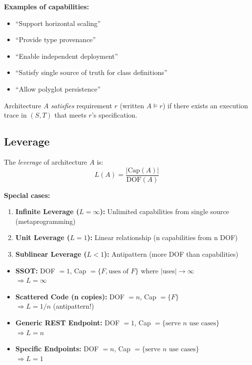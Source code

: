 \textbf{Examples of capabilities:}
\begin{itemize}
\item ``Support horizontal scaling''
\item ``Provide type provenance''
\item ``Enable independent deployment''
\item ``Satisfy single source of truth for class definitions''
\item ``Allow polyglot persistence''
\end{itemize}

\begin{definition}\label{def:satisfies}
Architecture $A$ \emph{satisfies} requirement $r$ (written $A \vDash r$) if there exists an execution trace in $(S, T)$ that meets $r$'s specification.
\end{definition}

\subsection{Leverage}

\begin{definition}[Leverage]\label{def:leverage}
The \emph{leverage} of architecture $A$ is:
\[
L(A) = \frac{|\text{Cap}(A)|}{\text{DOF}(A)}
\]
\end{definition}

\textbf{Special cases:}
\begin{enumerate}
\item \textbf{Infinite Leverage ($L = \infty$):} Unlimited capabilities from single source (metaprogramming)
\item \textbf{Unit Leverage ($L = 1$):} Linear relationship (n capabilities from n DOF)
\item \textbf{Sublinear Leverage ($L < 1$):} Antipattern (more DOF than capabilities)
\end{enumerate}

\begin{example}
\begin{itemize}
\item \textbf{SSOT:} DOF $= 1$, Cap $= \{F, \text{uses of } F\}$ where $|$uses$| \to \infty$ \\
  $\Rightarrow L = \infty$

\item \textbf{Scattered Code (n copies):} DOF $= n$, Cap $= \{F\}$ \\
  $\Rightarrow L = 1/n$ (antipattern!)

\item \textbf{Generic REST Endpoint:} DOF $= 1$, Cap $= \{\text{serve } n \text{ use cases}\}$ \\
  $\Rightarrow L = n$

\item \textbf{Specific Endpoints:} DOF $= n$, Cap $= \{\text{serve } n \text{ use cases}\}$ \\
  $\Rightarrow L = 1$
\end{itemize}
\end{example}

